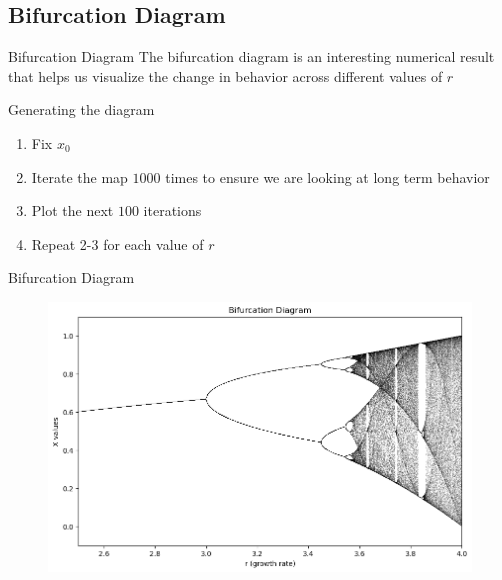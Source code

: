 \documentclass[
	11pt, %
]{beamer}
\begin{document}
\subsection{Bifurcation Diagram}
\begin{frame}{Bifurcation Diagram}
The bifurcation diagram is an interesting numerical result that helps us visualize the change in behavior across different values of $r$

\begin{block}{Generating the diagram}
\begin{enumerate}
    \item Fix $x_0$
    \item Iterate the map $1000$ times to ensure we are looking at long term behavior
    \item Plot the next $100$ iterations
    \item Repeat 2-3 for each value of $r$
\end{enumerate}
\end{block}
\end{frame}
\begin{frame}{Bifurcation Diagram}
     	\begin{figure}
	\includegraphics[scale=0.5]{./figures/bifurcations}
	\end{figure}
    
\end{frame}
\end{document}
